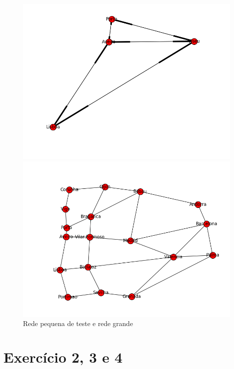 \documentclass[pdftex,12pt,a4paper]{report}
\begin{document}
\begin{figure}[!htb]
  \centering
  \begin{minipage}[b]{0.4\textwidth}
    \includegraphics[width=\textwidth]{imagensGuia/esquema_rede_pequena.png}
  \end{minipage}
  \hfill
  \begin{minipage}[b]{0.4\textwidth}
    \includegraphics[width=\textwidth]{imagensGuia/esquema_rede_grande.png}
  \end{minipage}
  \caption{Rede pequena de teste e rede grande}
\end{figure}


\section{Exercício 2, 3 e 4}
\end{document}
